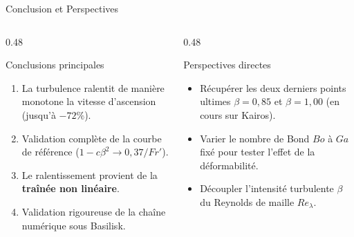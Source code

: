 \documentclass[11pt,aspectratio=169]{beamer}
\begin{document}
\begin{frame}{Conclusion et Perspectives}
  \begin{columns}[T]
    \begin{column}{0.48\textwidth}
      \begin{block}{Conclusions principales}
        \begin{enumerate}
          \item La turbulence ralentit de manière monotone la vitesse d'ascension (jusqu'à $-72\%$).
          \item Validation complète de la courbe de référence ($1-c\beta^2 \to 0{,}37/Fr'$).
          \item Le ralentissement provient de la \textbf{traînée non linéaire}.
          \item Validation rigoureuse de la chaîne numérique sous Basilisk.
        \end{enumerate}
      \end{block}
    \end{column}

    \begin{column}{0.48\textwidth}
      \begin{block}{Perspectives directes}
        \begin{itemize}
          \item Récupérer les deux derniers points ultimes $\beta=0{,}85$ et $\beta=1{,}00$ (en cours sur Kairos).
          \item Varier le nombre de Bond $Bo$ à $Ga$ fixé pour tester l'effet de la déformabilité.
          \item Découpler l'intensité turbulente $\beta$ du Reynolds de maille $Re_\lambda$.
        \end{itemize}
      \end{block}
    \end{column}
  \end{columns}
\end{frame}
\end{document}

